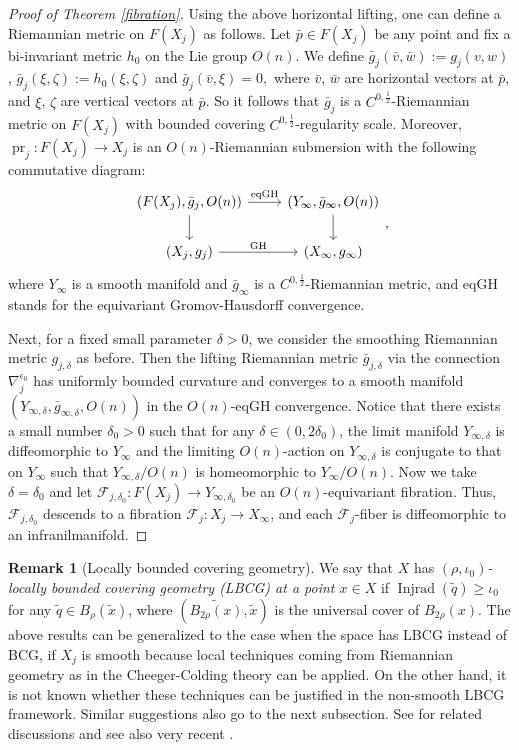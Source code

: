 \documentclass[11pt,reqno]{amsart}
\theoremstyle{definition}
\newtheorem{remark}[theorem]{Remark}
\numberwithin{equation}{section}
\DeclareMathOperator{\Injrad}{Injrad}
\DeclareMathOperator{\pr}{pr}
\begin{document}
\begin{proof}[Proof of Theorem \ref{fibration}]
Using the above horizontal lifting, one can define a  Riemannian metric on $F(X_j)$ as follows.
Let $\bar{p} \in F(X_j)$ be any point and fix a bi-invariant metric $h_0$ on the Lie group $O(n)$. We define 
$
 \bar{g}_j(\bar{v}, \bar{w}) :=  g_j (v, w)$,    $\bar{g}_j(\xi, \zeta) := h_0(\xi, \zeta)$ and  $\bar{g}_j(\bar{v}, \xi) = 0,
$
where 
$\bar{v}$, $\bar{w}$ are horizontal vectors at $\bar{p}$, and $\xi$, $\zeta$ are vertical vectors at $\bar{p}$.
So it follows that $\bar{g}_j$ is a $C^{0,\frac{1}{2}}$-Riemannian metric on $F(X_j)$ with bounded covering $C^{0,\frac{1}{2}}$-regularity scale.
Moreover, $\pr_j: F(X_j) \to X_j$
is an $O(n)$-Riemannian submersion with the following 
commutative diagram:
\begin{equation}
\begin{tikzcd}
(F(X_j) ,\bar{g}_j, O(n)) \arrow{r}{\mathrm{eqGH}} \arrow[swap]{d}{ } & (Y_{\infty}, \bar{g}_{\infty}, O(n)) \arrow{d}{ } \\
 (X_j, g_j)  \arrow{r}{\mathrm{GH}} & (X_{\infty}, g_{\infty})
\end{tikzcd},	
\end{equation}
where $Y_{\infty}$ is a smooth manifold and $\bar{g}_{\infty}$ is a  $C^{0,\frac{1}{2}}$-Riemannian metric, and eqGH stands for the equivariant Gromov-Hausdorff convergence.

Next, for a fixed small parameter $\delta > 0$, we consider the smoothing Riemannian metric $g_{j, \delta}$
as before. Then the lifting Riemannian metric $\bar{g}_{j, \delta}$ via the connection $\nabla_j^{\epsilon_0}$ has 
uniformly bounded curvature and converges to a smooth manifold 
$(Y_{\infty, \delta}, \bar{g}_{\infty, \delta}, O(n) )$ in the $O(n)$-eqGH convergence. Notice that there exists a small number $\delta_0 > 0$ such that for any $\delta \in (0, 2\delta_0)$, the limit manifold $Y_{\infty, \delta}$ is diffeomorphic to  $Y_{\infty}$ and the limiting $O(n)$-action on $Y_{\infty, \delta}$ is conjugate to that on $Y_{\infty}$ such that $Y_{\infty, \delta}/O(n)$ is homeomorphic to $Y_{\infty}/O(n)$.  
Now we take $\delta = \delta_0$ and let $\mathscr{F}_{j, \delta_0}: F(X_j) \to Y_{\infty, \delta_0}$ be an $O(n)$-equivariant fibration. 
Thus,    $\mathscr{F}_{j, \delta_0}$ descends to a fibration $\mathscr{F}_j: X_j\to X_{\infty}$, and each $\mathscr{F}_j$-fiber is diffeomorphic to an infranilmanifold. 
\end{proof}
\begin{remark}[Locally bounded covering geometry]
We say that $X$ has \emph{$(\rho, \iota_0)$-locally bounded covering geometry (LBCG) at a point $x\in X$} if  $\Injrad(\tilde{q}) \geq \iota_0$ for any $\tilde{q} \in B_{\rho}(\tilde{x})$, where $(\widetilde{B_{2\rho}(x)}, \tilde{x})$ is the universal cover of $B_{2\rho}(x)$.
    The above results can be generalized to the case when the space has LBCG instead of BCG, if $X_j$ is smooth because local techniques coming from Riemannian geometry as in the Cheeger-Colding theory can be applied. On the other hand, it is not known whether these techniques can be justified in the non-smooth LBCG framework.
    Similar suggestions also go to the next subsection. See  \cite{HondaSun} for related discussions and see also very recent \cite{ANRV}.
\end{remark}
\end{document}
